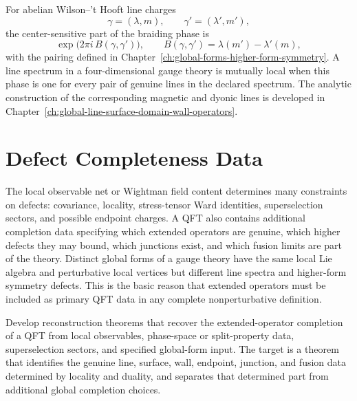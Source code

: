 For abelian Wilson--'t Hooft line charges
\[
  \gamma=(\lambda,m),
  \qquad
  \gamma'=(\lambda',m'),
\]
the center-sensitive part of the braiding phase is
\[
  \exp\bigl(2\pi i\,B(\gamma,\gamma')\bigr),
  \qquad
  B(\gamma,\gamma')=\lambda(m')-\lambda'(m),
\]
with the pairing defined in
Chapter~\ref{ch:global-forms-higher-form-symmetry}.  A line spectrum in a
four-dimensional gauge theory is mutually local when this phase is one for
every pair of genuine lines in the declared spectrum.  The analytic
construction of the corresponding magnetic and dyonic lines is developed in
Chapter~\ref{ch:global-line-surface-domain-wall-operators}.

\section{Defect Completeness Data}

The local observable net or Wightman field content determines many
constraints on defects: covariance, locality, stress-tensor Ward identities,
superselection sectors, and possible endpoint charges.  A QFT also contains
additional completion data specifying which extended operators are genuine,
which higher defects they may bound, which junctions exist, and which fusion
limits are part of the theory.  Distinct global forms of a gauge theory have
the same local Lie algebra and perturbative local vertices but different
line spectra and higher-form symmetry defects.  This is the basic reason that
extended operators must be included as primary QFT data in any complete
nonperturbative definition.

\begin{openproblem}
\label{op:extended-operators-from-local-reconstruction}
Develop reconstruction theorems that recover the extended-operator
completion of a QFT from local observables, phase-space or split-property
data, superselection sectors, and specified global-form input.  The target
is a theorem that identifies the genuine line, surface, wall, endpoint,
junction, and fusion data determined by locality and duality, and separates
that determined part from additional global completion choices.
\end{openproblem}
